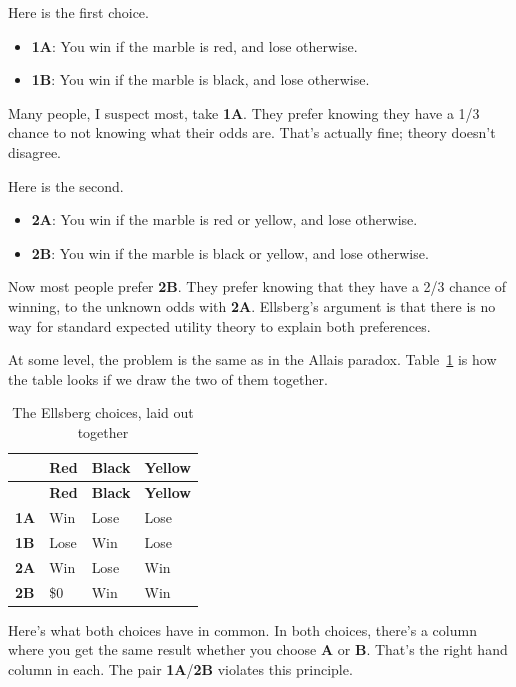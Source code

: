 \documentclass[
  11pt,
  letterpaper,
]{scrbook}
\providecommand{\tightlist}{%
  \setlength{\itemsep}{0pt}\setlength{\parskip}{0pt}}
\begin{document}
Here is the first choice.

\begin{itemize}
\tightlist
\item
  \textbf{1A}: You win if the marble is red, and lose otherwise.
\item
  \textbf{1B}: You win if the marble is black, and lose otherwise.
\end{itemize}

Many people, I suspect most, take \textbf{1A}. They prefer knowing they
have a 1/3 chance to not knowing what their odds are. That's actually
fine; theory doesn't disagree.

Here is the second.

\begin{itemize}
\tightlist
\item
  \textbf{2A}: You win if the marble is red or yellow, and lose
  otherwise.
\item
  \textbf{2B}: You win if the marble is black or yellow, and lose
  otherwise.
\end{itemize}

Now most people prefer \textbf{2B}. They prefer knowing that they have a
2/3 chance of winning, to the unknown odds with \textbf{2A}. Ellsberg's
argument is that there is no way for standard expected utility theory to
explain both preferences.

At some level, the problem is the same as in the Allais paradox.
Table~\ref{tbl-ellsberg} is how the table looks if we draw the two of
them together.

\begin{longtable}[]{@{}llll@{}}
\caption{The Ellsberg choices, laid out
together}\label{tbl-ellsberg}\tabularnewline
\toprule\noalign{}
& \textbf{Red} & \textbf{Black} & \textbf{Yellow} \\
\midrule\noalign{}
\endfirsthead
\toprule\noalign{}
& \textbf{Red} & \textbf{Black} & \textbf{Yellow} \\
\midrule\noalign{}
\endhead
\bottomrule\noalign{}
\endlastfoot
\textbf{1A} & Win & Lose & Lose \\
\textbf{1B} & Lose & Win & Lose \\
\textbf{2A} & Win & Lose & Win \\
\textbf{2B} & \$0 & Win & Win \\
\end{longtable}

Here's what both choices have in common. In both choices, there's a
column where you get the same result whether you choose \textbf{A} or
\textbf{B}. That's the right hand column in each. The pair
\textbf{1A}/\textbf{2B} violates this principle.
\end{document}
